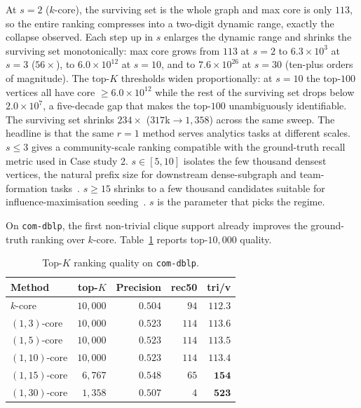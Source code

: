 At $s\!=\!2$ ($k$-core), the surviving set is the whole graph and max core is only $113$, so the entire ranking compresses into a two-digit dynamic range, exactly the collapse \cite{nucleusSariyuce14} observed.
%
Each step up in $s$ enlarges the dynamic range and shrinks the surviving set monotonically: max core grows from $113$ at $s\!=\!2$ to $6.3{\times}10^{3}$ at $s\!=\!3$ ($56{\times}$), to $6.0{\times}10^{12}$ at $s\!=\!10$, and to $7.6{\times}10^{26}$ at $s\!=\!30$ (ten-plus orders of magnitude).
%
The top-$K$ thresholds widen proportionally: at $s\!=\!10$ the top-$100$ vertices all have core $\ge\!6.0{\times}10^{12}$ while the rest of the surviving set drops below $2.0{\times}10^{7}$, a five-decade gap that makes the top-$100$ unambiguously identifiable.
%
The surviving set shrinks $234{\times}$ ($317$k$\to$$1{,}358$) across the same sweep.
%
The headline is that the same $r{=}1$ method serves analytics tasks at different scales.
%
$s\!\le\!3$ gives a community-scale ranking compatible with the ground-truth recall metric used in Case study 2.
%
$s\!\in\![5,10]$ isolates the few thousand densest vertices, the natural prefix size for downstream dense-subgraph and team-formation tasks~\cite{dense_subgraph,communities_dec1,communities_dec2}.
%
$s\!\ge\!15$ shrinks to a few thousand candidates suitable for influence-maximisation seeding~\cite{kempe2003maximizing,Identifying_influential}.
%
$s$ is the parameter that picks the regime.

\label{sec:cs-quality}
On \texttt{com-dblp}, the first non-trivial clique support already improves the ground-truth ranking over $k$-core.
%
Table~\ref{tab:cs3} reports top-$10{,}000$ quality.

\begin{table}[t]
\centering
\caption{Top-$K$ ranking quality on \texttt{com-dblp}.}
\label{tab:cs3}
\tiny
\begin{tabular}{lrrrr}
\toprule
Method & top-$K$ & Precision & rec50 & tri/v \\
\midrule
$k$-core      & $10{,}000$ & $0.504$ & $94$  & $112.3$ \\
$(1,3)$-core  & $10{,}000$ & $0.523$ & $114$ & $113.6$ \\
$(1,5)$-core  & $10{,}000$ & $0.523$ & $114$ & $113.5$ \\
$(1,10)$-core & $10{,}000$ & $0.523$ & $114$ & $113.4$ \\
$(1,15)$-core & $6{,}767$  & $\boldsymbol{0.548}$ & $65$ & $\boldsymbol{154}$ \\
$(1,30)$-core & $1{,}358$  & $0.507$ & $4$ & $\boldsymbol{523}$ \\
\bottomrule
\end{tabular}
\end{table}

